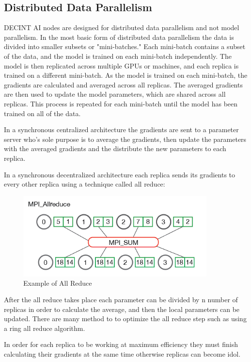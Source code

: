 \documentclass[11pt]{article}
\begin{document}
\subsection{Distributed Data Parallelism}
DECINT AI nodes are designed for distributed data parallelism and not model parallelism. In the most basic form of distributed data parallelism the data is divided into smaller subsets or "mini-batches." Each mini-batch contains a subset of the data, and the model is trained on each mini-batch independently. The model is then replicated across multiple GPUs or machines, and each replica is trained on a different mini-batch. As the model is trained on each mini-batch, the gradients are calculated and averaged across all replicas. The averaged gradients are then used to update the model parameters, which are shared across all replicas. This process is repeated for each mini-batch until the model has been trained on all of the data.

In a synchronous centralized architecture the gradients are sent to a parameter server who's sole purpose is to average the gradients, then update the parameters with the averaged gradients and the distribute the new parameters  to each replica.

In a synchronous decentralized architecture each replica sends its gradients to every other replica using a technique called all reduce: 

\begin{figure}[h]
  \centering
  \includegraphics[width=10cm]{img.png}
  \caption{Example of All Reduce}
\end{figure}

After the all reduce takes place each parameter can be divided by n number of replicas in order to calculate the average, and then the local parameters can be updated. There are many method to to optimize the all reduce step such as using a ring all reduce algorithm. 

In order for each replica to be working at maximum efficiency they must finish calculating their gradients at the same time otherwise replicas can become idol.
\end{document}
